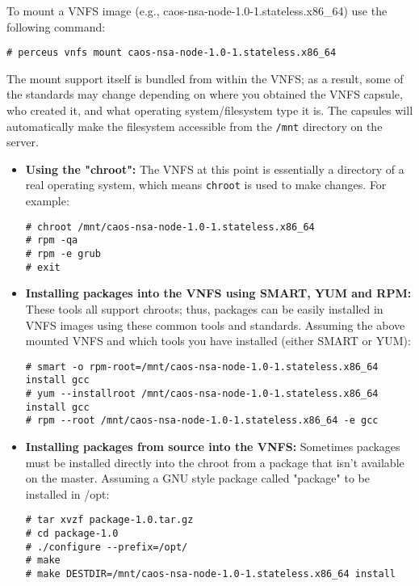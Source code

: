 \documentclass[10pt,letterpaper]{report}
\begin{document}
To mount a VNFS image (e.g., caos-nsa-node-1.0-1.stateless.x86\_64) use the
following command:

\begin{verbatim}
# perceus vnfs mount caos-nsa-node-1.0-1.stateless.x86_64
\end{verbatim}

The mount support itself is bundled from within the VNFS; as a result, some of
the standards may change depending on where you obtained the VNFS capsule, who
created it, and what operating system/filesystem type it is.  The capsules
will automatically make the filesystem accessible from the {\tt /mnt}
directory on the server.

\begin{itemize}

\item {\bf Using the "chroot":}  The VNFS at this point is essentially a
directory of a real operating system, which means {\tt chroot} is used to make
changes.  For example:

\begin{verbatim}
# chroot /mnt/caos-nsa-node-1.0-1.stateless.x86_64
# rpm -qa
# rpm -e grub
# exit
\end{verbatim}

\item {\bf Installing packages into the VNFS using SMART, YUM and RPM:}  These
tools all support chroots; thus, packages can be easily installed in VNFS images
using these common tools and standards.  Assuming the above mounted VNFS and
which tools you have installed (either SMART or YUM):

\begin{verbatim}
# smart -o rpm-root=/mnt/caos-nsa-node-1.0-1.stateless.x86_64 install gcc
# yum --installroot /mnt/caos-nsa-node-1.0-1.stateless.x86_64 install gcc
# rpm --root /mnt/caos-nsa-node-1.0-1.stateless.x86_64 -e gcc
\end{verbatim}

\item {\bf Installing packages from source into the VNFS:}  Sometimes packages
must be installed directly into the chroot from a package that isn't available
on the master.  Assuming a GNU style package called "package" to be installed
in /opt:

\begin{verbatim}
# tar xvzf package-1.0.tar.gz
# cd package-1.0
# ./configure --prefix=/opt/
# make
# make DESTDIR=/mnt/caos-nsa-node-1.0-1.stateless.x86_64 install
\end{verbatim}


\end{itemize}
\end{document}
